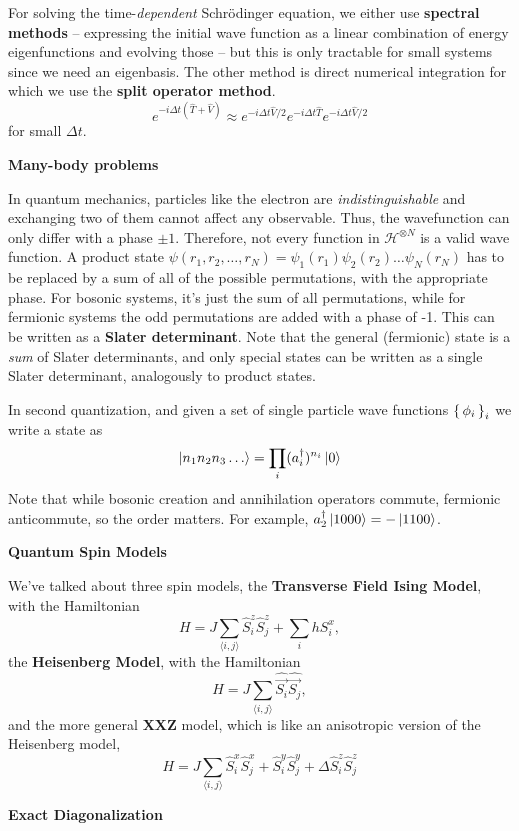 \documentclass[10pt,landscape]{article}
\newcommand{\topiccolor}{green}
\newcommand{\topic}[2]{%
	\renewcommand{\topiccolor}{#1}
	\begin{tcolorbox}[boxsep=0.5mm, left=1mm, right=1mm, top=0mm, bottom=0mm,
		colback=#1!30, colframe=#1, arc is angular]%
		\centering \textbf{#2}%
	\end{tcolorbox}%
}
\newcommand{\cbf}[1]{\textcolor{\topiccolor!80!black}{\textbf{#1}}}
\begin{document}
\begin{multicols*}{3}
For solving the time-\emph{dependent} Schrödinger equation, we either use
\cbf{spectral methods} -- expressing the initial wave function as a linear combination
of energy eigenfunctions and evolving those -- but this is only tractable for
small systems since we need an eigenbasis. The other method is direct numerical
integration for which we use the \cbf{split operator method}.
\[
	e^{-i\Delta t(\hat T + \hat V)} \approx 
	e^{-i \Delta t \hat V / 2} e^{-i \Delta t \hat T} e^{-i \Delta t \hat V / 2}
\]
for small $\Delta t$.

\topic{green}{Many-body problems}

In quantum mechanics, particles like the electron are \emph{indistinguishable}
and exchanging two of them cannot affect any observable. Thus, the wavefunction
can only differ with a phase $\pm1$.
Therefore, not every function in $\mathcal H^{\otimes N}$ is a valid wave
function.
A product state 
$\psi(r_1, r_2, \ldots, r_N) = \psi_1(r_1) \psi_2(r_2) \ldots \psi_N(r_N)$
has to be replaced by a sum of all of the possible permutations, with the
appropriate phase. For bosonic systems, it's just the sum of all permutations,
while for fermionic systems the odd permutations are added with a phase of -1.
This can be written as a \cbf{Slater determinant}.
Note that the general (fermionic) state is a \emph{sum} of Slater determinants,
and only special states can be written as a single Slater determinant,
analogously to product states.

In second quantization, and given a set of single particle wave functions
$\set{\phi_i}_i$ we write a state as
\[
	\ket{n_1 n_2 n_3 \ldots} = \prod_i (a_i^\dagger)^{n_i} \ket 0
\]
Note that while bosonic creation and annihilation operators commute, fermionic
anticommute, so the order matters. For example, 
$a_2^\dagger\ket{1000} = -\ket{1100}$.

\topic{purple}{Quantum Spin Models}

We've talked about three spin models,
the \cbf{Transverse Field Ising Model}, with the Hamiltonian
\[
	H = J\sum_{\langle i,j \rangle} \hat S_i^z \hat S_j^z + \sum_i h S_i^x,
\]
the \cbf{Heisenberg Model}, with the Hamiltonian
\[
	H = J\sum_{\langle i,j \rangle} \hat{\vec{S_i}} \hat{\vec{S_j}},
\]
and the more general \cbf{XXZ} model, which is like an anisotropic version of
the Heisenberg model,
\[
	H = J\sum_{\langle i,j \rangle}  \hat S_i^x \hat S_j^x + \hat S_i^y \hat
	S_j^y + \Delta \hat S_i^z \hat S_j^z
\]

\topic{violet}{Exact Diagonalization}


\end{multicols*}
\end{document}
